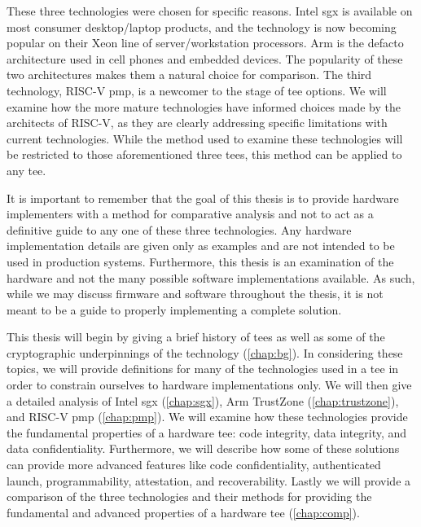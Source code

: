 These three technologies were chosen for specific reasons. Intel \gls{sgx} is available on most consumer desktop/laptop products, and the technology is now becoming popular on their Xeon line of server/workstation processors. Arm is the defacto architecture used in cell phones and embedded devices. The popularity of these two architectures makes them a natural choice for comparison. The third technology, RISC-V \gls{pmp}, is a newcomer to the stage of \gls{tee} options. We will examine how the more mature technologies have informed choices made by the architects of RISC-V, as they are clearly addressing specific limitations with current technologies. While the method used to examine these technologies will be restricted to those aforementioned three \glspl{tee}, this method can be applied to any \gls{tee}.

It is important to remember that the goal of this thesis is to provide hardware implementers with a method for comparative analysis and not to act as a definitive guide to any one of these three technologies. Any hardware implementation details are given only as examples and are not intended to be used in production systems. Furthermore, this thesis is an examination of the hardware and not the many possible software implementations available. As such, while we may discuss firmware and software throughout the thesis, it is not meant to be a guide to properly implementing a complete solution.

This thesis will begin by giving a brief history of \glspl{tee} as well as some of the cryptographic underpinnings of the technology (\autoref{chap:bg}). In considering these topics, we will provide definitions for many of the technologies used in a \gls{tee} in order to constrain ourselves to hardware implementations only. We will then give a detailed analysis of Intel \gls{sgx} (\autoref{chap:sgx}), Arm TrustZone (\autoref{chap:trustzone}), and RISC-V \gls{pmp} (\autoref{chap:pmp}). We will examine how these technologies provide the fundamental properties of a hardware \gls{tee}: code integrity, data integrity, and data confidentiality. Furthermore, we will describe how some of these solutions can provide more advanced features like code confidentiality, authenticated launch, programmability, attestation, and recoverability. Lastly we will provide a comparison of the three technologies and their methods for providing the fundamental and advanced properties of a hardware \gls{tee} (\autoref{chap:comp}).